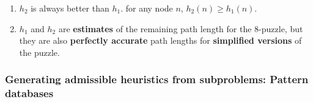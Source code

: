\begin{enumerate}[itemsep=0.2cm]
    \item $h_2$ is always better than $h_1$.
    for any node $n$, $h_2(n) \geq h_1(n)$.
    \hfill \cite{ai/book/Artificial-Intelligence-A-Modern-Approach/Russell-Norvig}

    \item $h_1$ and $h_2$ are \textbf{estimates} of the remaining path length for the $8$-puzzle, but they are also \textbf{perfectly accurate} path lengths for \textbf{simplified versions} of the puzzle.
    \hfill \cite{ai/book/Artificial-Intelligence-A-Modern-Approach/Russell-Norvig}

    
\end{enumerate}




\subsubsection{Generating admissible heuristics from subproblems: Pattern databases}

